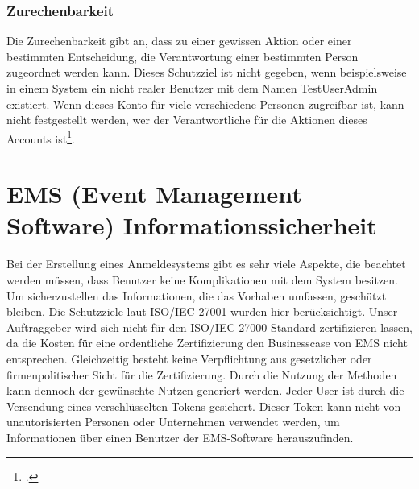 \subsubsection{Zurechenbarkeit}
Die Zurechenbarkeit gibt an, dass zu einer gewissen Aktion oder einer bestimmten Entscheidung, die Verantwortung einer bestimmten Person zugeordnet werden kann. Dieses Schutzziel ist nicht gegeben, wenn beispielsweise in einem System ein nicht realer Benutzer mit dem Namen TestUserAdmin existiert. Wenn dieses Konto für viele verschiedene Personen zugreifbar ist, kann nicht festgestellt werden, wer der Verantwortliche für die Aktionen dieses Accounts ist\footcite{Lehrunterlagen-HTL-cloud}.

\section{EMS (Event Management Software) Informationssicherheit}
Bei der Erstellung eines Anmeldesystems gibt es sehr viele Aspekte, die beachtet werden müssen, dass Benutzer keine Komplikationen mit dem System besitzen. Um sicherzustellen das Informationen, die das Vorhaben umfassen, geschützt bleiben. Die Schutzziele laut ISO/IEC 27001 wurden hier berücksichtigt. Unser Auftraggeber wird sich nicht für den ISO/IEC 27000 Standard zertifizieren lassen, da die Kosten für eine ordentliche Zertifizierung den Businesscase von EMS nicht entsprechen. Gleichzeitig besteht keine Verpflichtung aus gesetzlicher oder firmenpolitischer Sicht für die Zertifizierung. Durch die Nutzung der Methoden kann dennoch der gewünschte Nutzen generiert werden.
Jeder User ist durch die Versendung eines verschlüsselten Tokens gesichert. Dieser Token kann nicht von unautorisierten Personen oder Unternehmen verwendet werden, um Informationen über einen Benutzer der EMS-Software herauszufinden. 

